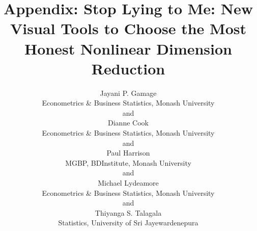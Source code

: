 \documentclass[
  12pt]{article}
\begin{document}
\def\spacingset#1{\renewcommand{\baselinestretch}%
{#1}\small\normalsize} \spacingset{1}



\title{\bf Appendix: Stop Lying to Me: New Visual Tools to Choose the
Most Honest Nonlinear Dimension Reduction}
\author{
Jayani P. Gamage\\
Econometrics \& Business Statistics, Monash University\\
and\\Dianne Cook\\
Econometrics \& Business Statistics, Monash University\\
and\\Paul Harrison\\
MGBP, BDInstitute, Monash University\\
and\\Michael Lydeamore\\
Econometrics \& Business Statistics, Monash University\\
and\\Thiyanga S. Talagala\\
Statistics, University of Sri Jayewardenepura\\
}
\maketitle

\bigskip
\bigskip
\begin{abstract}

\end{abstract}


\newpage
\spacingset{1.9} %
\end{document}
